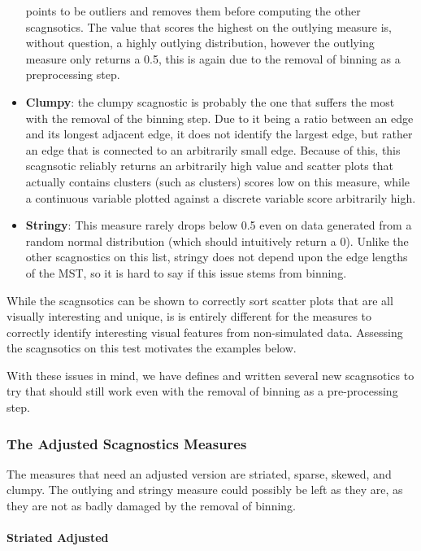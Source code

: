 \begin{itemize}
  points to be outliers and removes them before computing the other
  scagnsotics. The value that scores the highest on the outlying measure
  is, without question, a highly outlying distribution, however the
  outlying measure only returns a 0.5, this is again due to the removal
  of binning as a preprocessing step.
\item
  \textbf{Clumpy}: the clumpy scagnostic is probably the one that
  suffers the most with the removal of the binning step. Due to it being
  a ratio between an edge and its longest adjacent edge, it does not
  identify the largest edge, but rather an edge that is connected to an
  arbitrarily small edge. Because of this, this scagnsotic reliably
  returns an arbitrarily high value and scatter plots that actually
  contains clusters (such as clusters) scores low on this measure, while
  a continuous variable plotted against a discrete variable score
  arbitrarily high.
\item
  \textbf{Stringy}: This measure rarely drops below 0.5 even on data
  generated from a random normal distribution (which should intuitively
  return a 0). Unlike the other scagnostics on this list, stringy does
  not depend upon the edge lengths of the MST, so it is hard to say if
  this issue stems from binning.
\end{itemize}

While the scagnsotics can be shown to correctly sort scatter plots that
are all visually interesting and unique, is is entirely different for
the measures to correctly identify interesting visual features from
non-simulated data. Assessing the scagnsotics on this test motivates the
examples below.

With these issues in mind, we have defines and written several new
scagnsotics to try that should still work even with the removal of
binning as a pre-processing step.

\hypertarget{the-adjusted-scagnostics-measures}{%
\subsubsection{The Adjusted Scagnostics
Measures}\label{the-adjusted-scagnostics-measures}}

The measures that need an adjusted version are striated, sparse, skewed,
and clumpy. The outlying and stringy measure could possibly be left as
they are, as they are not as badly damaged by the removal of binning.

\hypertarget{striated-adjusted}{%
\paragraph{Striated Adjusted}\label{striated-adjusted}}

